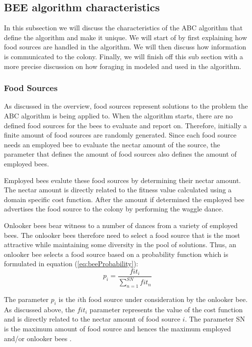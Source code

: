 \subsection{BEE algorithm characteristics}
In this subsection we will discuss the characteristics of the ABC algorithm that define the algorithm and make it unique. We will start of by first explaining how food sources are handled in the algorithm. We will then discuss how information is communicated to the colony. Finally, we will finish off this sub section with a more precise discussion on how foraging in modeled and used in the algorithm.
\subsubsection{Food Sources}
As discussed in the overview, food sources represent solutions to the problem the ABC algorithm is being applied to. When the algorithm starts, there are no defined food sources for the bees to evaluate and report on. Therefore, initially a finite amount of food sources are randomly generated. Since each food source needs an employed bee to evaluate the nectar amount of the source, the parameter that defines the amount of food sources also defines the amount of employed bees.

Employed bees evalute these food sources by determining their nectar amount. The nectar amount is directly related to the fitness value calculated using a domain specific cost function. After the amount if determined the employed bee advertises the food source to the colony by performing the waggle dance. 

Onlooker bees bear witness to a number of dances from a variety of employed bees. The onlooker bees therefore need to select a food source that is the most attractive while maintaining some diversity in the pool of solutions. Thus, an onlooker bee selects a food source based on a probability function which is formulated in equation (\ref{eq:beeProbability})\cite{ABCCompareStudy}:
\begin{equation}
\label{eq:beeProbability}
p_i = \frac{{fit}_i}{\sum^{SN}_{n=1}{fit}_n}
\end{equation}

The parameter $p_i$ is the $i$th food source under consideration by the onlooker bee. As discussed above, the ${fit}_i$ parameter represents the value of the cost function and is directly related to the nectar amount of food source $i$. The parameter SN is the maximum amount of food source and hences the maximum employed and/or onlooker bees \cite{ABCCompareStudy}.

